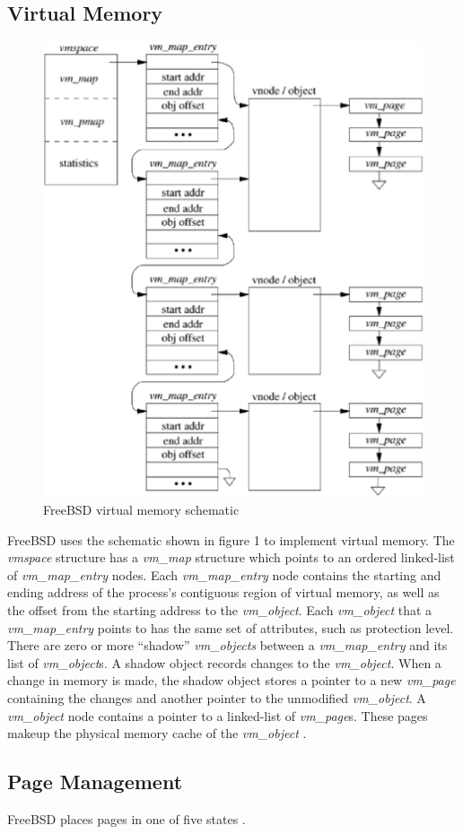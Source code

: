 \documentclass[onecolumn,draftclsnofoot, 10pt, compsoc]{IEEEtran}
\begin{document}
	\subsection{Virtual Memory}
		\begin{figure}[H]
			\includegraphics[width=.5\textwidth, height=.35\textheight]{freebsd.eps}
			\centering
			\caption{FreeBSD virtual memory schematic \cite{freeBSDMM}}
			\label{fig:mesh1}
		\end{figure}

		FreeBSD uses the schematic shown in figure 1 to implement virtual memory.
		The \textit{vmspace} structure has a \textit{vm\_map} structure which points to an ordered linked-list of \textit{vm\_map\_entry} nodes.
		Each \textit{vm\_map\_entry} node contains the starting and ending address of the process's contiguous region of virtual memory, as well as the offset from the starting address to the \textit{vm\_object}.
		Each \textit{vm\_object} that a \textit{vm\_map\_entry} points to has the same set of attributes, such as protection level.
		There are zero or more “shadow” \textit{vm\_objects} between a \textit{vm\_map\_entry} and its list of \textit{vm\_object}s.
		A shadow object records changes to the \textit{vm\_object}.
		When a change in memory is made, the shadow object stores a pointer to a new \textit{vm\_page} containing the changes and another pointer to the unmodified \textit{vm\_object}.
		A \textit{vm\_object} node contains a pointer to a linked-list of \textit{vm\_page}s.
		These pages makeup the physical memory cache of the \textit{vm\_object} \cite{freeBSDMM}. 
		
	\subsection{Page Management}
		FreeBSD places pages in one of five states \cite{freeBSDBook}.
		
\end{document}
